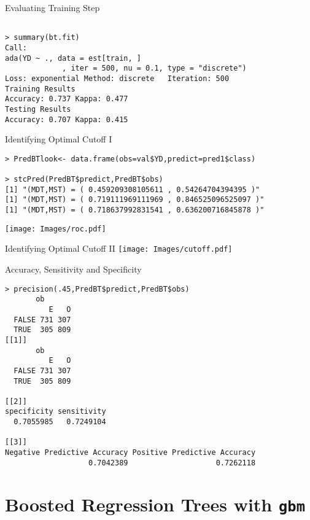 \documentclass{beamer}
\begin{document}
\begin{frame}[fragile]{Evaluating Training Step}
\scriptsize
\begin{verbatim}

> summary(bt.fit)
Call:
ada(YD ~ ., data = est[train, ]
             , iter = 500, nu = 0.1, type = "discrete")
Loss: exponential Method: discrete   Iteration: 500 
Training Results
Accuracy: 0.737 Kappa: 0.477 
Testing Results
Accuracy: 0.707 Kappa: 0.415 
\end{verbatim}
\normalsize
\end{frame}



\begin{frame}[fragile]{Identifying Optimal Cutoff I}
\scriptsize
\begin{verbatim}
> PredBTlook<- data.frame(obs=val$YD,predict=pred1$class)
 
> stcPred(PredBT$predict,PredBT$obs)
[1] "(MDT,MST) = ( 0.459209308105611 , 0.54264704394395 )"
[1] "(MDT,MST) = ( 0.719111969111969 , 0.846525096525097 )"
[1] "(MDT,MST) = ( 0.718637992831541 , 0.636200716845878 )"
\end{verbatim}
\texttt{[image: Images/roc.pdf]}
\normalsize
\end{frame}


\begin{frame}[fragile]{Identifying Optimal Cutoff II}
\texttt{[image: Images/cutoff.pdf]}
\end{frame}


\begin{frame}[fragile]{Accuracy, Sensitivity and Specificity}
\scriptsize
\begin{verbatim}
> precision(.45,PredBT$predict,PredBT$obs)
       ob
          E   O
  FALSE 731 307
  TRUE  305 809
[[1]]
       ob
          E   O
  FALSE 731 307
  TRUE  305 809

[[2]]
specificity sensitivity 
  0.7055985   0.7249104 

[[3]]
Negative Predictive Accuracy Positive Predictive Accuracy 
                   0.7042389                    0.7262118 
\end{verbatim}
\normalsize
\end{frame}





\section{Boosted Regression Trees with \texttt{gbm}}
\end{document}
